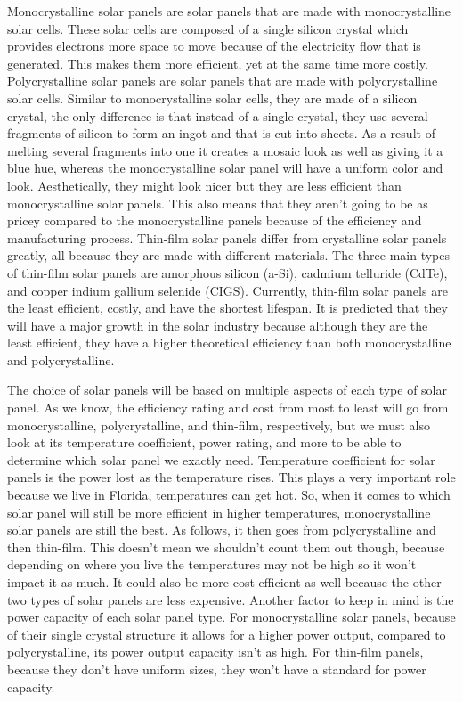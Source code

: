 Monocrystalline solar panels are solar panels that are made with monocrystalline solar cells. These solar cells are composed of a single silicon crystal which provides electrons more space to move because of the electricity flow that is generated. This makes them more efficient, yet at the same time more costly. Polycrystalline solar panels are solar panels that are made with polycrystalline solar cells. Similar to monocrystalline solar cells, they are made of a silicon crystal, the only difference is that instead of a single crystal, they use several fragments of silicon to form an ingot and that is cut into sheets. As a result of melting several fragments into one it creates a mosaic look as well as giving it a blue hue, whereas the monocrystalline solar panel will have a uniform color and look. Aesthetically, they might look nicer but they are less efficient than monocrystalline solar panels. This also means that they aren’t going to be as pricey compared to the monocrystalline panels because of the efficiency and manufacturing process. Thin-film solar panels differ from crystalline solar panels greatly, all because they are made with different materials. The three main types of thin-film solar panels are amorphous silicon (a-Si), cadmium telluride (CdTe), and copper indium gallium selenide (CIGS). Currently, thin-film solar panels are the least efficient, costly, and have the shortest lifespan. It is predicted that they will have a major growth in the solar industry because although they are the least efficient, they have a higher theoretical efficiency than both monocrystalline and polycrystalline.

The choice of solar panels will be based on multiple aspects of each type of solar panel. As we know, the efficiency rating and cost from most to least will go from monocrystalline, polycrystalline, and thin-film, respectively, but we must also look at its temperature coefficient, power rating, and more to be able to determine which solar panel we exactly need. Temperature coefficient for solar panels is the power lost as the temperature rises. This plays a very important role because we live in Florida, temperatures can get hot. So, when it comes to which solar panel will still be more efficient in higher temperatures, monocrystalline solar panels are still the best. As follows, it then goes from polycrystalline and then thin-film. This doesn’t mean we shouldn’t count them out though, because depending on where you live the temperatures may not be high so it won’t impact it as much. It could also be more cost efficient as well because the other two types of solar panels are less expensive. Another factor to keep in mind is the power capacity of each solar panel type. For monocrystalline solar panels, because of their single crystal structure it allows for a higher power output, compared to polycrystalline, its power output capacity isn’t as high. For thin-film panels, because they don’t have uniform sizes, they won’t have a standard for power capacity.


